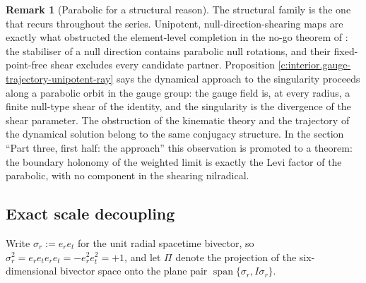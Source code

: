 \documentclass[11pt]{article}
\theoremstyle{definition}
\newtheorem{remark}[theorem]{Remark}
\theoremstyle{plain}
\providecommand{\er}{}\renewcommand{\er}{e_r}
\providecommand{\et}{}\renewcommand{\et}{e_t}
\begin{document}
\begin{remark}[Parabolic for a structural reason]\label{c:note.interior.parabolic-structural-reason}
The structural family is the one that recurs throughout the series. Unipotent, null-direction-shearing maps are exactly what obstructed the element-level completion in the no-go theorem of \cite[Thm.~4.2]{ButlerT1}: the stabiliser of a null direction contains parabolic null rotations, and their fixed-point-free shear excludes every candidate partner. Proposition \ref{c:interior.gauge-trajectory-unipotent-ray} says the dynamical approach to the singularity proceeds along a parabolic orbit in the gauge group: the gauge field is, at every radius, a finite null-type shear of the identity, and the singularity is the divergence of the shear parameter. The obstruction of the kinematic theory and the trajectory of the dynamical solution belong to the same conjugacy structure. In the section ``Part three, first half: the approach'' this observation is promoted to a theorem: the boundary holonomy of the weighted limit is exactly the Levi factor of the parabolic, with no component in the shearing nilradical.
\end{remark}

\subsection*{Exact scale decoupling}
\label{c:note.interior.setting-exact-scale-decoupling}
Write $\sigma_r := \er\et$ for the unit radial spacetime bivector, so $\sigma_r^2 = \er\et\er\et = -\er^2\et^2 = +1$, and let $\Pi$ denote the projection of the six-dimensional bivector space onto the plane pair $\operatorname{span}\{\sigma_r, I\sigma_r\}$.
\end{document}
